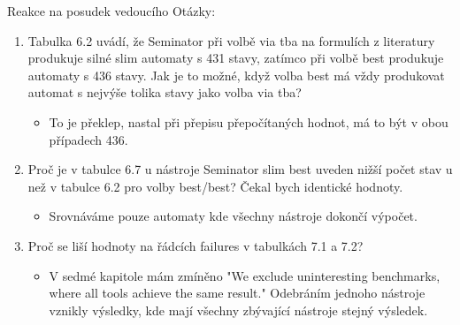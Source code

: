 \documentclass[
]{beamer}
\begin{document}
	\begin{frame}{Reakce na posudek vedoucího}		
		Otázky:
		\begin{enumerate}
			\item Tabulka 6.2 uvádí, že Seminator při volbě via tba na formulích z literatury produkuje silné slim automaty s 431 stavy, zatímco při volbě best produkuje automaty s 436 stavy. Jak je to možné, když volba best má vždy produkovat automat s nejvýše tolika stavy jako volba via tba?
			\begin{itemize}
				\item To je překlep, nastal při přepisu přepočítaných hodnot, má to být v obou případech 436.
			\end{itemize}
			\pause
			\item Proč je v tabulce 6.7 u nástroje Seminator slim best uveden nižší počet stav u než v tabulce 6.2 pro volby best/best? Čekal bych identické hodnoty.
			\begin{itemize}
				\item Srovnáváme pouze automaty kde všechny nástroje dokončí výpočet.
			\end{itemize}
			
			\pause
			\item Proč se liší hodnoty na řádcích failures v tabulkách 7.1 a 7.2?
			\begin{itemize}
				\item V sedmé kapitole mám zmíněno "We exclude uninteresting benchmarks, where all tools achieve the same result." 
				Odebráním jednoho nástroje vznikly výsledky, kde mají všechny zbývající nástroje stejný výsledek.
			\end{itemize}
			
		\end{enumerate}
		
		
	\end{frame}
	
\end{document}

